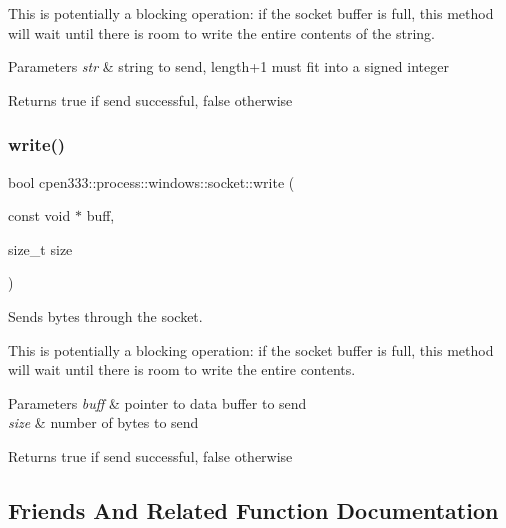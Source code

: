 This is potentially a blocking operation\+: if the socket buffer is full, this method will wait until there is room to write the entire contents of the string.


\begin{DoxyParams}{Parameters}
{\em str} & string to send, length+1 must fit into a signed integer \\
\hline
\end{DoxyParams}
\begin{DoxyReturn}{Returns}
true if send successful, false otherwise 
\end{DoxyReturn}
\mbox{\label{classcpen333_1_1process_1_1windows_1_1socket_a62255247b7e8a9963e9ae5c24c6e5348}} 
\subsubsection{\texorpdfstring{write()}{write()}\hspace{0.1cm}{\footnotesize\ttfamily [2/2]}}
{\footnotesize\ttfamily bool cpen333\+::process\+::windows\+::socket\+::write (\begin{DoxyParamCaption}\item[{const void $\ast$}]{buff,  }\item[{size\+\_\+t}]{size }\end{DoxyParamCaption})\hspace{0.3cm}{\ttfamily [inline]}}



Sends bytes through the socket. 

This is potentially a blocking operation\+: if the socket buffer is full, this method will wait until there is room to write the entire contents.


\begin{DoxyParams}{Parameters}
{\em buff} & pointer to data buffer to send \\
\hline
{\em size} & number of bytes to send \\
\hline
\end{DoxyParams}
\begin{DoxyReturn}{Returns}
true if send successful, false otherwise 
\end{DoxyReturn}


\subsection{Friends And Related Function Documentation}
\mbox{\label{classcpen333_1_1process_1_1windows_1_1socket_aba37c0ea463da9263b0712d3b3389066}} 
